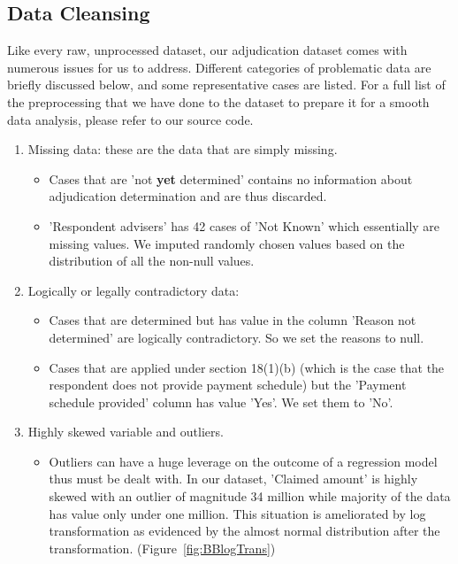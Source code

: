\documentclass[12pt, b4paper]{article}
\begin{document}
    \subsection{Data Cleansing}
    Like every raw, unprocessed dataset, our adjudication dataset comes with numerous issues for us to address. Different categories of problematic data are briefly discussed below, and some representative cases are listed. For a full list of the preprocessing that we have done to the dataset to prepare it for a smooth data analysis, please refer to our source code.
    \begin{enumerate}
      \item Missing data: these are the data that are simply missing. 
        \begin{itemize}
          \item Cases that are 'not \textbf{yet} determined' contains no information about adjudication determination and are thus discarded.
          \item 'Respondent advisers' has 42 cases of 'Not Known' which essentially are missing values. We imputed randomly chosen values based on the distribution of all the non-null values. 
        \end{itemize}
      \item Logically or legally contradictory data: 
        \begin{itemize}
          \item Cases that are determined but has value in the column 'Reason not determined' are logically contradictory. So we set the reasons to null.
          \item Cases that are applied under section 18(1)(b) (which is the case that the respondent does not provide payment schedule) but the 'Payment schedule provided' column has value 'Yes'. We set them to 'No'.
        \end{itemize}
      \item Highly skewed variable and outliers.
        \begin{itemize}
          \item Outliers can have a huge leverage on the outcome of a regression model thus must be dealt with. In our dataset, 'Claimed amount' is highly skewed with an outlier of magnitude 34 million while majority of the data has value only under one million. This situation is ameliorated by log transformation as evidenced by the almost normal distribution after the transformation. (Figure~\ref{fig:BBlogTrans})
      \begin{figure}

\end{figure}
\end{itemize}
\end{enumerate}
\end{document}
